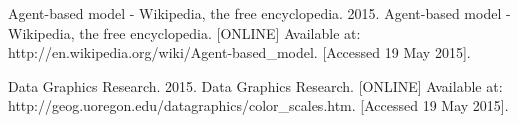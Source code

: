 \begin{thebibliography}{9}

 Agent-based model - Wikipedia, the free encyclopedia. 2015. Agent-based model - Wikipedia, the free encyclopedia. [ONLINE] Available at: http://en.wikipedia.org/wiki/Agent-based\_model. [Accessed 19 May 2015].

 Data Graphics Research. 2015. Data Graphics Research. [ONLINE] Available at: http://geog.uoregon.edu/datagraphics/color\_scales.htm. [Accessed 19 May 2015].

\end{thebibliography}